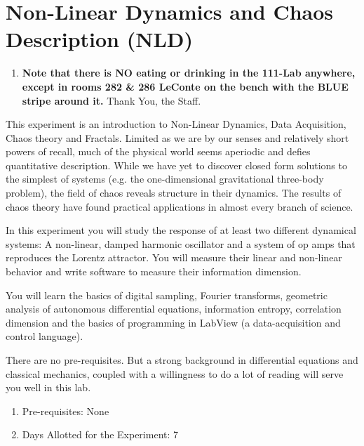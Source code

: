 \documentclass{../lab}
\begin{document}
\maketitle

\tableofcontents

\section{Non-Linear Dynamics and Chaos Description (NLD)}

\begin{enumerate}
    \item \textbf{Note that there is NO eating or drinking in the 111-Lab anywhere, except in rooms 282 \& 286 LeConte on the bench with the BLUE stripe around it.} Thank You, the Staff.
\end{enumerate}

\newpage

This experiment is an introduction to Non-Linear Dynamics, Data Acquisition, Chaos theory and Fractals. Limited as we are by our senses and relatively short powers of recall, much of the physical world seems aperiodic and defies quantitative description. While we have yet to discover closed form solutions to the simplest of systems (e.g. the one-dimensional gravitational three-body problem), the field of chaos reveals structure in their dynamics. The results of chaos theory have found practical applications in almost every branch of science.

In this experiment you will study the response of at least two different dynamical systems: A non-linear, damped harmonic oscillator and a system of op amps that reproduces the Lorentz attractor. You will measure their linear and non-linear behavior and write software to measure their information dimension.

You will learn the basics of digital sampling, Fourier transforms, geometric analysis of autonomous differential equations, information entropy, correlation dimension and the basics of programming in LabView (a data-acquisition and control language).

There are no pre-requisites. But a strong background in differential equations and classical mechanics, coupled with a willingness to do a lot of reading will serve you well in this lab.

\begin{enumerate}
    \item Pre-requisites: None

    \item Days Allotted for the Experiment: 7

\end{enumerate}
\end{document}
